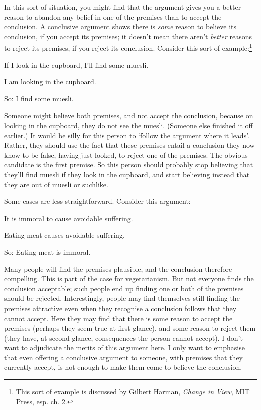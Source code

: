 In this sort of situation, you might find that the argument gives you a better reason to abandon any belief in one of the premises than to accept the conclusion. A conclusive argument shows there is \emph{some} reason to believe its conclusion, if you accept its premises; it doesn't mean there aren't \emph{better} reasons to reject its premises, if you reject its conclusion. Consider this sort of example:\footnote{This sort of example is discussed by Gilbert Harman, \emph{Change in View}, MIT Press, esp. ch. 2.} \begin{earg}
	\item[] If I look in the cupboard, I'll find some muesli.
	\item[] I am looking in the cupboard.
	\item[So:] I find some muesli.
\end{earg} Someone might believe both premises, and not accept the conclusion, because on looking in the cupboard, they do not see the muesli. (Someone else finished it off earlier.) It would be silly for this person to `follow the argument where it leads'. Rather, they should use the fact that these premises entail a conclusion they now know to be false, having just looked, to reject one of the premises. The obvious candidate is the first premise. So this person should probably stop believing that they'll find muesli if they look in the cupboard, and start believing instead that they are out of muesli or suchlike.

Some cases are less straightforward. Consider this argument: \begin{earg}
	\item[] It is immoral to cause avoidable suffering. 
	\item[] Eating meat causes avoidable suffering.
	\item[So:] Eating meat is immoral.
\end{earg}
Many people will find the premises plausible, and the conclusion therefore compelling. This is part of the case for vegetarianism. But not everyone finds the conclusion acceptable; such people end up finding one or both of the premises should be rejected. Interestingly, people may find themselves still finding the premises attractive even when they recognise a conclusion follows that they cannot accept. Here they may find that there is some reason to accept the premises (perhaps they seem true at first glance), and some reason to reject them (they have, at second glance, consequences the person cannot accept). I don't want to adjudicate the merits of this argument here. I only want to emphasise that even offering a conclusive argument to someone, with premises that they currently accept, is not enough to make them come to believe the conclusion.

